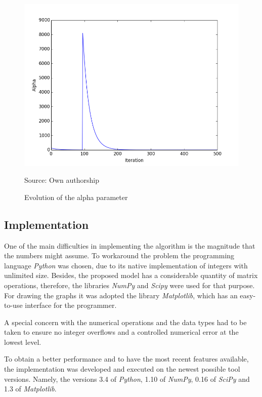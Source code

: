\documentclass[tuberlin,cic,tc,openright,english,noabntcite,oneside]{iiufrgs}
\begin{document}
\begin{figure}[H]
	\centering
    \caption{Evolution of the alpha parameter}
    \includegraphics[width=\textwidth]{fig_alpha_evolution}\par
	Source: Own authorship
    \label{fig:alpha_evolution}
\end{figure}

\subsection{Implementation}
One of the main difficulties in implementing the algorithm is the magnitude that the numbers might assume. To workaround the problem the programming language \emph{Python} was chosen, due to its native implementation of integers with unlimited size. Besides, the proposed model has a considerable quantity of matrix operations, therefore, the libraries \emph{NumPy} and \emph{Scipy} were used for that purpose. For drawing the graphs it was adopted the library \emph{Matplotlib}, which has an easy-to-use interface for the programmer.

A special concern with the numerical operations and the data types had to be taken to ensure no integer overflows and a controlled numerical error at the lowest level.

To obtain a better performance and to have the most recent features available, the implementation was developed and executed on the newest possible tool versions. Namely, the versions 3.4 of \emph{Python}, 1.10 of \emph{NumPy}, 0.16 of \emph{SciPy} and 1.3 of \emph{Matplotlib}.
\end{document}
